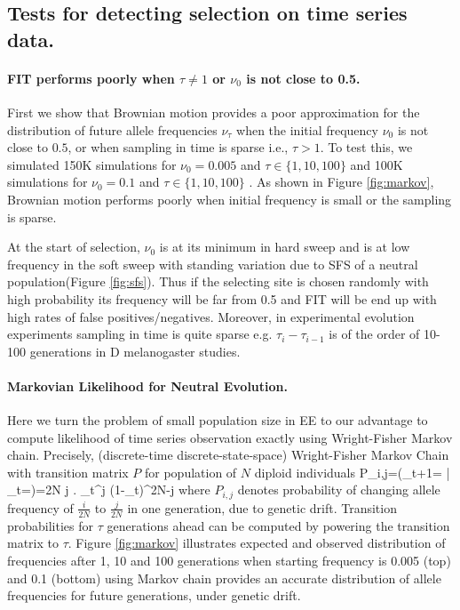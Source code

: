 \documentclass[11pt]{article}
\begin{document}
\subsection{Tests for detecting selection on time series data.}
\paragraph{FIT performs poorly when $\tau \neq 1$ or $\nu_0$ is not close to 
0.5.}
First we show that Brownian motion provides a poor 
approximation for the distribution of future allele frequencies $\nu_{\tau}$
when the initial frequency $\nu_0$ is not close to $0.5$, or when sampling in 
time is sparse i.e., 
$\tau>1$. 
To test this, we simulated 150K simulations for $\nu_0=0.005$ and 
$\tau\in\{1,10,100\}$ and 100K simulations for $\nu_0=0.1$ and 
$\tau\in\{1,10,100\}$ . As shown in Figure \ref{fig:markov}, Brownian motion 
performs poorly when initial frequency is small or the sampling is sparse.

At the start of selection, $\nu_0$ is at its minimum in hard sweep and is at 
low frequency in the soft sweep with standing variation due to SFS of a neutral 
population(Figure \ref{fig:sfs}). Thus if the selecting 
site is chosen randomly 
with high probability its frequency will be far from 0.5 and FIT will be end up 
with high rates of false positives/negatives. 
Moreover, in experimental evolution experiments sampling in time is quite 
sparse e.g. $\tau_i-\tau_{i-1}$ is of the order of 10-100 generations in D 
melanogaster studies.

\paragraph{Markovian Likelihood for Neutral Evolution.}
Here we turn the problem of small population size in EE to our advantage to 
compute likelihood of time series observation exactly using Wright-Fisher 
Markov chain.
Precisely,
(discrete-time discrete-state-space) Wright-Fisher Markov Chain with 
transition matrix $P$ for population of $N$ diploid individuals \cite{Ewens2012Mathematical}
\beq
P_{i,j}=\pr\left(\nu_{t+1}= \left| 
\nu_{t}=\right)={2N 
	\choose j} \right. 
\nu_{t}^j (1-\nu_{t})^{2N-j}  
\eeq
where $P_{i,j}$ denotes probability of 
changing allele frequency of $\frac{i}{2N}$ to $\frac{j}{2N}$ in one 
generation, due to genetic drift.
Transition probabilities for $\tau$ generations ahead 
can be computed by 
powering the transition matrix to $\tau$.
Figure \ref{fig:markov} illustrates expected and observed distribution of 
frequencies after 
1, 10 and 100 generations when starting frequency is 0.005 (top) and 0.1 
(bottom) using Markov chain provides an accurate distribution of 
allele frequencies 
for future generations, under genetic drift.
\end{document}
